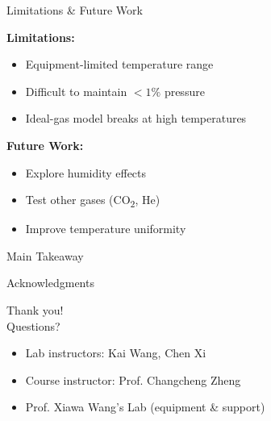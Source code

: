 \documentclass[12pt]{beamer}
\begin{document}
\begin{frame}{Limitations \& Future Work}

\textbf{Limitations:}
\begin{itemize}
    \item Equipment-limited temperature range
    \item Difficult to maintain $<1\%$ pressure
    \item Ideal-gas model breaks at high temperatures
\end{itemize}

\vspace{0.4cm}

\textbf{Future Work:}
\begin{itemize}
    \item Explore humidity effects
    \item Test other gases (CO\textsubscript{2}, He)
    \item Improve temperature uniformity
\end{itemize}

\end{frame}

\begin{frame}{Main Takeaway}
\begin{center}
\Large
{}
\end{center}
\end{frame}

\begin{frame}{Acknowledgments}

\vspace{0.5cm}
\begin{center}
\Large Thank you!\\[0.3cm]
Questions?
\end{center}

\begin{itemize}
    \tiny
    \item Lab instructors: Kai Wang, Chen Xi
    \item Course instructor: Prof. Changcheng Zheng
    \item Prof. Xiawa Wang's Lab (equipment \& support)
\end{itemize}

\end{frame}
\end{document}
